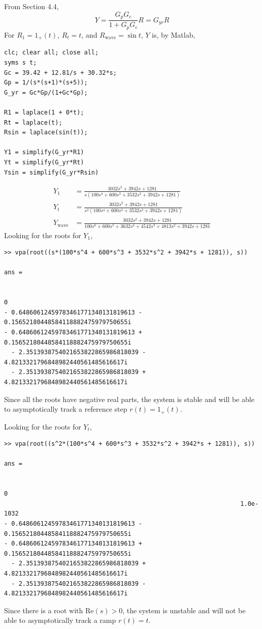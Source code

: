 \subsection{}
From Section 4.4, 
\begin{equation*}
    Y = \frac{G_p G_c}{1 + G_p G_c} R = G_{yr} R
\end{equation*}
For $R_{1} = 1_{+}(t)$, $R_{t} = t$, and $R_{\text{wave}} = \sin t$, $Y$ is, by Matlab,
\begin{verbatim}
clc; clear all; close all;
syms s t;
Gc = 39.42 + 12.81/s + 30.32*s;
Gp = 1/(s*(s+1)*(s+5));
G_yr = Gc*Gp/(1+Gc*Gp);

R1 = laplace(1 + 0*t);
Rt = laplace(t);
Rsin = laplace(sin(t));

Y1 = simplify(G_yr*R1)
Yt = simplify(G_yr*Rt)
Ysin = simplify(G_yr*Rsin)
\end{verbatim}
\begin{align*}
    Y_1 &= \frac{3032 s^2 + 3942 s + 1281}{s(100 s^4 + 600 s^3 + 3532 s^2 + 3942 s + 1281)} \\
    Y_t &= \frac{3032 s^2 + 3942 s + 1281}{s^2(100 s^4 + 600 s^3 + 3532 s^2 + 3942 s + 1281)} \\
    Y_{\text{wave}} &= \frac{3032 s^2 + 3942 s + 1281}{100 s^6 + 600 s^5 + 3632 s^4 + 4542 s^3 + 4813 s^2 + 3942 s + 1281}
\end{align*}
Looking for the roots for $Y_1$, 
\begin{verbatim}
>> vpa(root((s*(100*s^4 + 600*s^3 + 3532*s^2 + 3942*s + 1281)), s))
 
ans =
 
                                                                         0
- 0.64860612459783461771340131819613 - 0.15652180448584118882475979750655i
- 0.64860612459783461771340131819613 + 0.15652180448584118882475979750655i
  - 2.3513938754021653822865986818039 - 4.8213321796848982440561485616617i
  - 2.3513938754021653822865986818039 + 4.8213321796848982440561485616617i
\end{verbatim}
Since all the roots have negative real parts, the system is stable and will be able to asymptotically track a reference step $r(t) = 1_{+}(t)$.

Looking for the roots for $Y_t$,
\begin{verbatim}
>> vpa(root((s^2*(100*s^4 + 600*s^3 + 3532*s^2 + 3942*s + 1281)), s))
 
ans =
 
                                                                         0
                                                                 1.0e-1032
- 0.64860612459783461771340131819613 - 0.15652180448584118882475979750655i
- 0.64860612459783461771340131819613 + 0.15652180448584118882475979750655i
  - 2.3513938754021653822865986818039 + 4.8213321796848982440561485616617i
  - 2.3513938754021653822865986818039 - 4.8213321796848982440561485616617i
\end{verbatim}
Since there is a root with Re$(s) > 0$, the system is unstable and will not be able to asymptotically track a ramp $r(t) = t$.

